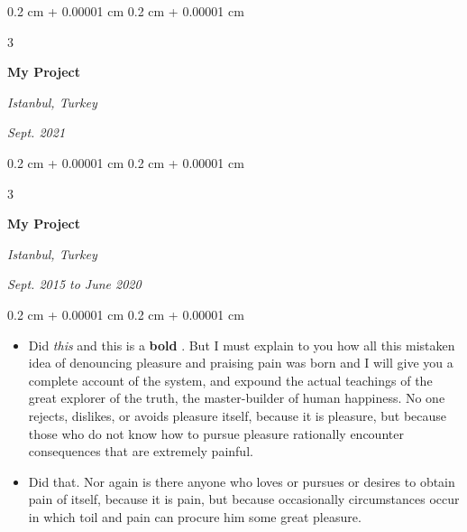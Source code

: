 \documentclass[10pt, letterpaper]{article}
\newenvironment{highlights}{
    \begin{itemize}[
        topsep=0.10 cm,
        parsep=0.10 cm,
        partopsep=0pt,
        itemsep=0pt,
        leftmargin=0.4 cm + 10pt + 0.6 cm
    ]
}{
    \end{itemize}
} %
\newenvironment{onecolentry}{
    \begin{adjustwidth}{
        0.2 cm + 0.00001 cm
    }{
        0.2 cm + 0.00001 cm
    }
}{
    \end{adjustwidth}
} %
\newenvironment{threecolentry}[3][]{
    \onecolentry
    \def\thirdColumn{#3}
    \setcolumnwidth{0.6 cm, \fill, 4.5 cm}
    \begin{paracol}{3}
    #2 \switchcolumn
}{
    \switchcolumn \raggedleft \thirdColumn
    \end{paracol}
    \endonecolentry
} %
\let\hrefWithoutArrow\href
\renewcommand{\href}[2]{\hrefWithoutArrow{#1}{\mbox{\ifthenelse{\equal{#2}{}}{ }{#2 }\raisebox{.15ex}{\footnotesize \faExternalLink*}}}}
\begin{document}
        \vspace{0.2 cm-3px}

        \begin{threecolentry}{
            \vspace*{\fill}
            \textbullet
            \vspace*{3px}
            \vspace*{\fill}
        }{
        \textit{Istanbul, Turkey}    
            
        \textit{Sept. 2021}}
            \textbf{My Project}
        \end{threecolentry}



        \vspace{0.2 cm-3px}

        \begin{threecolentry}{
            \vspace*{\fill}
            \textbullet
            \vspace*{3px}
            \vspace*{\fill}
        }{
        \textit{Istanbul, Turkey}    
            
        \textit{Sept. 2015 to June 2020}}
            \textbf{My Project}
        \end{threecolentry}

        \vspace{0.10 cm-3px}
        \begin{onecolentry}
            \begin{highlights}
                \item Did \textit{this} and this is a \textbf{bold} \href{https://example.com}{link}. But I must explain to you how all this mistaken idea of denouncing pleasure and praising pain was born and I will give you a complete account of the system, and expound the actual teachings of the great explorer of the truth, the master-builder of human happiness. No one rejects, dislikes, or avoids pleasure itself, because it is pleasure, but because those who do not know how to pursue pleasure rationally encounter consequences that are extremely painful.
                \item Did that. Nor again is there anyone who loves or pursues or desires to obtain pain of itself, because it is pain, but because occasionally circumstances occur in which toil and pain can procure him some great pleasure.
            \end{highlights}
        \end{onecolentry}
\end{document}
